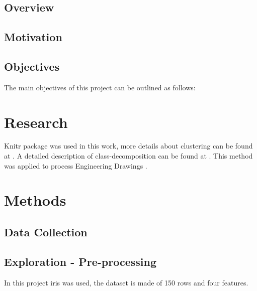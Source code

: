 \documentclass[10pt]{article}\usepackage[]{graphicx}\usepackage[]{color}
\begin{document}
\subsection{Overview}\label{over}

\blindtext[2]

\subsection{Motivation}\label{mot}
\blindtext[2]

\subsection{Objectives }\label{obj}
The main objectives of this project can be outlined as follows: 
\section{Research}\label{research}

\blindtext[2] Knitr package was used in this work\cite{knitr2013}, more details about clustering can be found at \cite{ELYAN2017220}. A detailed description of class-decomposition can be found at \cite{Elyan2016}. This method was applied to process Engineering Drawings \cite{8489087}.




\section {Methods}\label{methods}

\blindtext[2]



\subsection{Data Collection}\label{dataset}



\blindtext[2]


\subsection{Exploration - Pre-processing}\label{explore}

\blindtext[2]

In this project iris was used, the dataset is made of 150 rows and four features. \\
\end{document}
